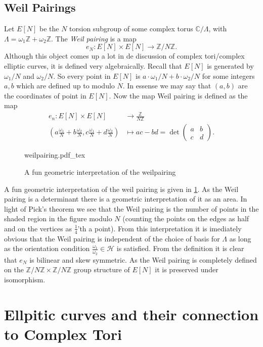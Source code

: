 \documentclass[a4paper]{article}
\newcommand{\incfig}[1]{%
	\def\svgwidth{\columnwidth}
	{#1.pdf_tex}
}
\theoremstyle{theoremdd}
\theoremstyle{definitiondd}
\theoremstyle{remarkdd}
\newcommand{\Z}{\mathbb{Z}}
\newcommand{\C}{\mathbb{C}}
\begin{document}
\subsection{Weil Pairings} \label{sec:Weil_Pairings}
Let $E[N]$ be the  $N$ torsion subgroup of some complex torus $\C / \Lambda$, with $\Lambda = \omega_1\Z + \omega_2 \Z$. 
The \emph{Weil pairing} is a map \[
	e_N: E[N] \times E[N] \to \Z / N\Z
.\] 
Although this object comes up a lot in de discussion of complex tori/complex elliptic curves, it is defined very algebraically. 
Recall that $E[N]$ is generated by $\omega_1 / N$ and $\omega_2 / N$. So every point in $E[N]$ is  $a \cdot \omega_1 / N + b \cdot \omega_2 / N$ for some integers $a, b$ which are defined up to modulo $N$. In essense we may say that $(a, b)$ are the coordinates of point in $E[N]$. 
Now the map Weil pairing is defined as the map
\begin{align*}
	e_n: E[N] \times  E[N] &\longrightarrow \frac{\Z}{N\Z} \\
	\left(a \frac{\omega_1}{N} + b \frac{\omega_2}{N}, c \frac{\omega_1}{N} + d \frac{\omega_2}{N}\right) &\longmapsto ac-bd =  \det \begin{pmatrix} a & b \\ c& d \end{pmatrix} 
.\end{align*}
\begin{figure}[h]
	\incfig{weilpairing}
	\caption{A fun geometric interpretation of the weilpairing}
	\label{fig:weilpairing}
\end{figure}
A fun geometric interpretation of the weil pairing is given in \cref{fig:weilpairing}. As the Weil pairing is a determinant there is a geometric interpretation of it as an area. In light of Pick's theorem \cite{wiki:pick} we see that the Weil pairing is the number of points in the shaded region in the figure modulo $N$ (counting the points on the edges as half and on the vertices as $\frac{1}{4}$'th a point). 
From this interpretation it is imediately obvious that the Weil pairing is independent of the choice of basis for  $\Lambda$ as long as the orientation condition $\frac{\omega_1}{\omega_2} \in \mathcal{H}$ is satisfied. 
From the definition it is clear that $e_N$ is bilinear and skew symmetric.
As the Weil pairing is completely defined on the  $\Z / N \Z \times  \Z / N\Z$ group structure of $E[N]$ it is preserved under isomorphism.
\section{Ellpitic curves and their connection to Complex Tori}
\end{document}
